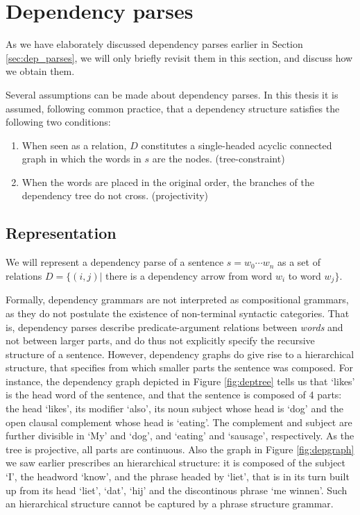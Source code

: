 \section{Dependency parses}
\label{sec:depparses}

As we have elaborately discussed dependency parses earlier in Section \ref{sec:dep_parses}, we will only briefly revisit them in this section, and discuss how we obtain them.

Several assumptions can be made about dependency parses. In this thesis it is assumed, following common practice, that a dependency structure satisfies the following two conditions:\begin{enumerate}
\item When seen as a relation, $D$ constitutes a single-headed acyclic connected graph in which the words in $s$ are the nodes. (tree-constraint)
\item When the words are placed in the original order, the branches of the dependency tree do not cross. (projectivity)
\end{enumerate}

\subsection{Representation}

We will represent a dependency parse of a sentence $s = w_0\cdots w_n$ as a set of relations $D = \{(i,j)|$ there is a dependency arrow from word $w_i$ to word $w_j \}$. 

Formally, dependency grammars are not interpreted as compositional grammars, as they do not postulate the existence of non-terminal syntactic categories. That is, dependency parses describe predicate-argument relations between \textit{words} and not between larger parts, and do thus not explicitly specify the recursive structure of a sentence. However, dependency graphs do give rise to a hierarchical structure, that specifies from which smaller parts the sentence was composed. For instance, the dependency graph depicted in Figure \ref{fig:deptree} tells us that `likes' is the head word of the sentence, and that the sentence is composed of 4 parts: the head `likes', its modifier `also', its noun subject whose head is `dog' and the open clausal complement whose head is `eating'. The complement and subject are further divisible in `My' and `dog', and `eating' and `sausage', respectively. As the tree is projective, all parts are continuous. Also the graph in Figure \ref{fig:depgraph} we saw earlier prescribes an hierarchical structure: it is composed of the subject `I', the headword `know', and the phrase headed by `liet', that is in its turn built up from its head `liet', `dat', `hij' and the discontinous phrase `me winnen'. Such an hierarchical structure cannot be captured by a phrase structure grammar.


